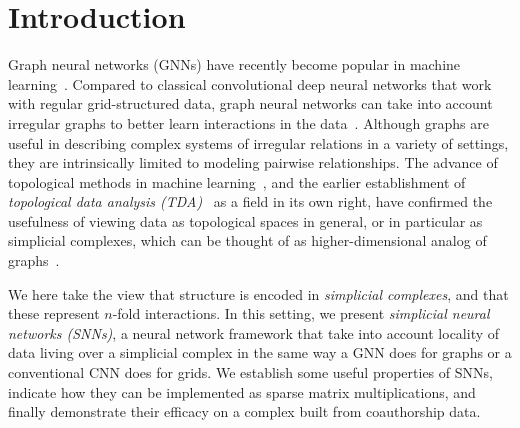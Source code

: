 \section{Introduction}

Graph neural networks (GNNs) have recently become popular in machine learning~\cite{defferrard2016convolutional, bronstein2017geometric, wu2020survey}.
Compared to classical convolutional deep neural networks that work with regular grid-structured data, graph neural networks can take into account irregular graphs to better learn interactions in the data~\cite{battaglia2018relational}. Although graphs are useful in describing complex systems of irregular relations in a variety of settings, they are intrinsically limited to modeling pairwise relationships. The advance of topological methods in machine learning~\cite{Gabrielsson2020topological, Hofer2019LearningRO, rieck2018neural}, and the earlier establishment of \emph{topological data analysis (TDA)}~\cite{carlsson2008,chazal2017,edelsbrunner2010computational,ghrist2008barcodes} as a field in its own right, have confirmed the usefulness of viewing data as topological spaces in general, or in particular as simplicial complexes, which can be thought of as higher-dimensional analog of graphs~\cite{moore2012,patania2017}.


We here take the view that structure is encoded in \emph{simplicial complexes}, and that these represent $n$-fold interactions. In this setting, we present \emph{simplicial neural networks (SNNs)}, a neural network framework that take into account locality of data living over a simplicial complex in the same way a GNN does for graphs or a conventional CNN does for grids.
We establish some useful properties of SNNs, indicate how they can be implemented as sparse matrix multiplications, and finally demonstrate their efficacy on a complex built from coauthorship data.

